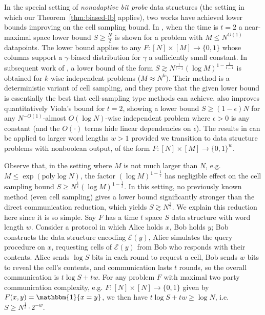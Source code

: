 \documentclass[11pt]{article}
\newcommand{\B}{\{0,1\}}
\newcommand{\poly}{\mathrm{poly}}
\newcommand{\N}{[N]}
\begin{document}
In the special setting of \emph{nonadaptive bit probe} data structures (the setting in which our Theorem~\ref{thm:biased-lb} applies), two works have achieved lower bounds improving on the cell sampling bound. In \cite{viola-maximal}, when the time is $t=2$ a near-maximal space lower bound $S \geq \frac{N}{2}$ is shown for a problem with $M \leq N^{O(1)}$ datapoints. The lower bound applies to any $F: [N] \times [M] \to \B$ whose columns support a $\gamma$-biased distribution for $\gamma$ a sufficiently small constant. 
In subsequent work of \cite{golovnev}, a lower bound of the form $S \gtrsim N^{\frac{1}{t-1}} (\log M)^{1-\frac{1}{t-1}}$ is obtained for $k$-wise independent problems ($M \approx N^k)$. Their method is a deterministic variant of cell sampling, and they prove that the given lower bound is essentially the best that cell-sampling type methods can achieve. \cite{golovnev} also improves quantitatively Viola's bound for $t=2$, showing a lower bound $S \geq (1-\epsilon)N$ for any $N^{-O(1)}$-almost $O(\log N)$-wise independent problem where $\epsilon > 0$ is any constant (and the $O(\cdot)$ terms hide linear dependencies on $\epsilon$).
The results in \cite{golovnev} can be applied to larger word lengths $w>1$ provided we transition to data structure problems with nonboolean output, of the form $F:[N] \times [M] \to \B^w$. 

Observe that, in the setting where $M$ is not much larger than $N$, e.g. $M \leq \exp(\poly\log N)$, the factor $(\log M)^{1 - \frac{1}{t}}$ has negligible effect on the cell sampling bound $S \geq N^{\frac{1}{t}} (\log M)^{1 - \frac{1}{t}}$. In this setting, no previously known method (even cell sampling) gives a lower bound significantly stronger than the direct communication reduction, which yields $S \gtrsim N^{\frac{1}{t}}$. We explain this reduction here since it is so simple. Say $F$ has a time $t$ space $S$ data structure with word length $w$. Consider a protocol in which Alice holds $x$, Bob holds $y$; Bob constructs the data structure encoding $\mathcal{E}(y)$, Alice simulates the query procedure on $x$, requesting cells of $\mathcal{E}(y)$ from Bob who responds with their contents. Alice sends $\log S$ bits in each round to request a cell, Bob sends $w$ bits to reveal the cell's contents, and communication lasts $t$ rounds, so the overall communication is $t \log S + tw$. For any problem $F$ with maximal two party communication complexity, e.g. $F:\N \times \N \to \B$ given by $F(x,y) = \mathbbm{1}\{x=y\}$, we then have $t\log S + tw \geq \log N$, i.e. $S\geq  N^{\frac{1}{t}} \cdot 2^{-w}$.
\end{document}
